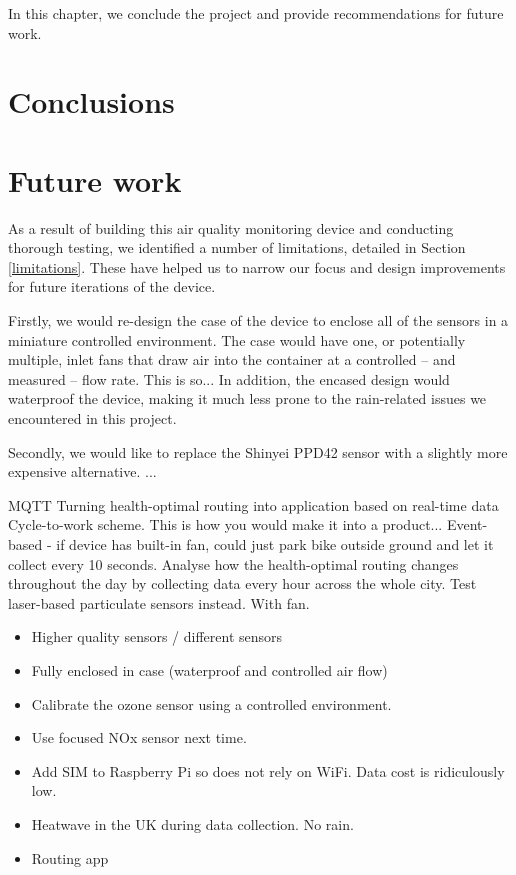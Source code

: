 \documentclass[11pt]{report}
\begin{document}
In this chapter, we conclude the project and provide recommendations for future work.

\section{Conclusions}

\section{Future work}

As a result of building this air quality monitoring device and conducting thorough testing, we identified a number of limitations, detailed in Section \ref{limitations}. These have helped us to narrow our focus and design improvements for future iterations of the device.

Firstly, we would re-design the case of the device to enclose all of the sensors in a miniature controlled environment. The case would have one, or potentially multiple, inlet fans that draw air into the container at a controlled -- and measured -- flow rate. This is so... In addition, the encased design would waterproof the device, making it much less prone to the rain-related issues we encountered in this project.

Secondly, we would like to replace the Shinyei PPD42 sensor with a slightly more expensive alternative. ...

MQTT
Turning health-optimal routing into application based on real-time data
Cycle-to-work scheme.
This is how you would make it into a product...
Event-based - if device has built-in fan, could just park bike outside ground and let it collect every 10 seconds.
Analyse how the health-optimal routing changes throughout the day by collecting data every hour across the whole city.
Test laser-based particulate sensors instead. With fan.


\begin{itemize}
\item Higher quality sensors / different sensors
\item Fully enclosed in case (waterproof and controlled air flow)
\item Calibrate the ozone sensor using a controlled environment.
\item Use focused NOx sensor next time.
\item Add SIM to Raspberry Pi so does not rely on WiFi. Data cost is ridiculously low.
\item Heatwave in the UK during data collection. No rain.
\item Routing app
\end{itemize}
\end{document}
